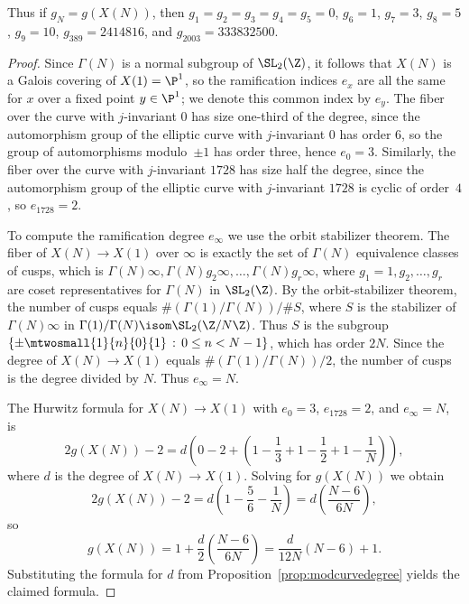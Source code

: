\documentclass{report}
\begin{document}
Thus if $g_N=g(X(N))$, then $g_1=g_2=g_3=g_4=g_5=0$, $g_6=1$,
$g_7=3$, $g_8=5$, $g_9=10$, $g_{389}=2414816$, and $g_{2003} =
333832500$.

\begin{proof}
  Since $\Gamma(N)$ is a normal subgroup of $\SL_2(\Z)$, it follows
  that $X(N)$ is a Galois covering of $X(1)=\P^1$, so the ramification
  indices $e_x$ are all the same for $x$ over a fixed point $y\in
  \P^1$; we denote this common index by $e_y$. The fiber over the
  curve with $j$-invariant $0$ has size one-third of the degree, since
  the automorphism group of the elliptic curve with $j$-invariant $0$
  has order $6$, so the group of automorphisms modulo~$\pm 1$ has
  order three, hence $e_0=3$. Similarly, the fiber over the curve with
  $j$-invariant $1728$ has size half the degree, since the
  automorphism group of the elliptic curve with $j$-invariant $1728$
  is cyclic of order~$4$, so $e_{1728}=2$.

To compute the ramification degree $e_\infty$ we use the orbit
stabilizer theorem.  The fiber of $X(N)\to X(1)$ over $\infty$ is
exactly the set of $\Gamma(N)$ equivalence classes of cusps, which
is $\Gamma(N)\infty, \Gamma(N)g_2\infty, \ldots,
\Gamma(N)g_r\infty$, where $g_1=1, g_2, \ldots, g_r$ are coset
representatives for $\Gamma(N)$ in $\SL_2(\Z)$. By the
orbit-stabilizer theorem, the number of cusps equals
$\#(\Gamma(1)/\Gamma(N))/\#S$, where $S$ is the stabilizer of
$\Gamma(N)\infty$ in $\Gamma(1)/\Gamma(N)\isom \SL_2(\Z/N\Z)$.
Thus $S$ is the subgroup $\left\{\pm \mtwosmall{1}{n}{0}{1} \,:\,
0\leq n < N-1\right\}$, which has order $2N$.  Since the degree of
$X(N)\to X(1)$ equals $\#(\Gamma(1)/\Gamma(N))/2$, the number of
cusps is the degree divided by $N$.  Thus $e_\infty = N$.

The Hurwitz formula for $X(N)\to X(1)$ with $e_0=3$, $e_{1728}=2$,
and $e_\infty=N$, is $$2g(X(N))-2 = d\left(0-2 +
\left(1-\frac{1}{3} + 1-\frac{1}{2} +
1-\frac{1}{N}\right)\right),$$ where $d$ is the degree of $X(N)\to
X(1)$. Solving for $g(X(N))$ we obtain
\[
2g(X(N)) - 2 = d \left(1 - \frac{5}{6} - \frac{1}{N}\right)
           = d \left( \frac{N-6}{6N}\right),
\]
so
\[
g(X(N)) = 1 + \frac{d}{2}\left(\frac{N-6}{6N}\right) =
\frac{d}{12N}(N-6) + 1.
\]
Substituting the formula for $d$ from
Proposition~\ref{prop:modcurvedegree} yields the claimed formula.

\end{proof}
\end{document}
